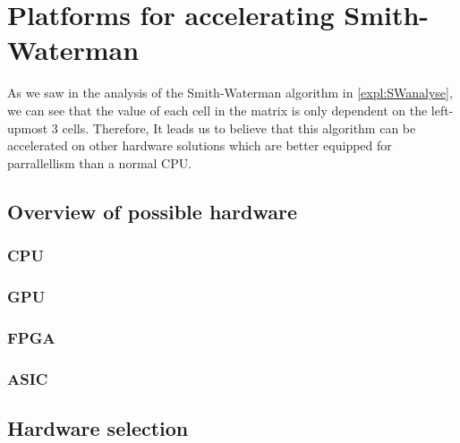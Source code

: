 
\chapter{Platforms for accelerating Smith-Waterman}
\label{ch:Platforms}

As we saw in the analysis of the Smith-Waterman algorithm in \ref{expl:SWanalyse}, we can see that the value of each cell in the matrix is only dependent on the left-upmost 3 cells. Therefore, It leads us to believe that this algorithm can be accelerated on other hardware solutions which are better equipped for parrallellism than a normal CPU.

\section{Overview of possible hardware}

\subsection{CPU}
\subsection{GPU}
\subsection{FPGA}
\subsection{ASIC}

\section{Hardware selection}


